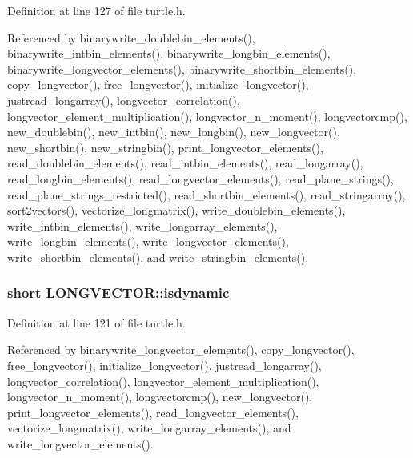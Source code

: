 Definition at line 127 of file turtle.\-h.



Referenced by binarywrite\-\_\-doublebin\-\_\-elements(), binarywrite\-\_\-intbin\-\_\-elements(), binarywrite\-\_\-longbin\-\_\-elements(), binarywrite\-\_\-longvector\-\_\-elements(), binarywrite\-\_\-shortbin\-\_\-elements(), copy\-\_\-longvector(), free\-\_\-longvector(), initialize\-\_\-longvector(), justread\-\_\-longarray(), longvector\-\_\-correlation(), longvector\-\_\-element\-\_\-multiplication(), longvector\-\_\-n\-\_\-moment(), longvectorcmp(), new\-\_\-doublebin(), new\-\_\-intbin(), new\-\_\-longbin(), new\-\_\-longvector(), new\-\_\-shortbin(), new\-\_\-stringbin(), print\-\_\-longvector\-\_\-elements(), read\-\_\-doublebin\-\_\-elements(), read\-\_\-intbin\-\_\-elements(), read\-\_\-longarray(), read\-\_\-longbin\-\_\-elements(), read\-\_\-longvector\-\_\-elements(), read\-\_\-plane\-\_\-strings(), read\-\_\-plane\-\_\-strings\-\_\-restricted(), read\-\_\-shortbin\-\_\-elements(), read\-\_\-stringarray(), sort2vectors(), vectorize\-\_\-longmatrix(), write\-\_\-doublebin\-\_\-elements(), write\-\_\-intbin\-\_\-elements(), write\-\_\-longarray\-\_\-elements(), write\-\_\-longbin\-\_\-elements(), write\-\_\-longvector\-\_\-elements(), write\-\_\-shortbin\-\_\-elements(), and write\-\_\-stringbin\-\_\-elements().

\hypertarget{struct_l_o_n_g_v_e_c_t_o_r_a8a2b78c0cfb3a6b507f3eb1b40544c48}{
\subsubsection[{isdynamic}]{\setlength{\rightskip}{0pt plus 5cm}short L\-O\-N\-G\-V\-E\-C\-T\-O\-R\-::isdynamic}}\label{struct_l_o_n_g_v_e_c_t_o_r_a8a2b78c0cfb3a6b507f3eb1b40544c48}


Definition at line 121 of file turtle.\-h.



Referenced by binarywrite\-\_\-longvector\-\_\-elements(), copy\-\_\-longvector(), free\-\_\-longvector(), initialize\-\_\-longvector(), justread\-\_\-longarray(), longvector\-\_\-correlation(), longvector\-\_\-element\-\_\-multiplication(), longvector\-\_\-n\-\_\-moment(), longvectorcmp(), new\-\_\-longvector(), print\-\_\-longvector\-\_\-elements(), read\-\_\-longvector\-\_\-elements(), vectorize\-\_\-longmatrix(), write\-\_\-longarray\-\_\-elements(), and write\-\_\-longvector\-\_\-elements().

